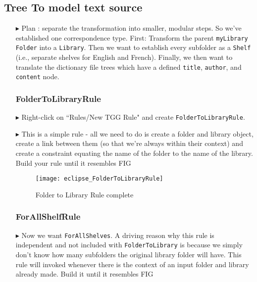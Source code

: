 \newpage
\hypertarget{treeToModel tex}{}
\subsection{Tree To model text source}
\texHeader

\begin{itemize}

\item[$\blacktriangleright$] Plan : separate the transformation into smaller, modular steps. So we've established one correspondence type. First: Transform the
parent \texttt{myLibrary} \texttt{Folder} into a \texttt{Library}. Then we want to establish every subfolder as a \texttt{Shelf} (i.e., separate shelves
for English and French). Finally, we then want to translate the dictionary file trees which have a defined \texttt{title}, \texttt{author}, and \texttt{content}
node.

\subsubsection{FolderToLibraryRule} %

\item[$\blacktriangleright$] Right-click on ``Rules/New TGG Rule" and create \texttt{Folder\-To\-Lib\-rary\-Rule}.

\item[$\blacktriangleright$] This is a simple rule - all we need to do is create a folder and library object, create a link between them (so that we're
always within their context) and create a constraint equating the name of the folder to the name of the library. Build your rule until it resembles FIG

\begin{figure}[htbp]
\begin{center}
  \texttt{[image: eclipse\_FolderToLibraryRule]}
  \caption{Folder to Library Rule complete}
  \label{eclipse:FolderToLibraryRule}
\end{center}
\end{figure}

\subsubsection{ForAllShelfRule} %

\item[$\blacktriangleright$] Now we want \texttt{ForAllShelves}. A driving reason why this rule is independent and not included with \texttt{FolderToLibrary} is
because we simply don't know how many subfolders the original library folder will have. This rule will invoked whenever there is the context of an input folder
and library already made. Build it until it resembles FIG


\end{itemize}

